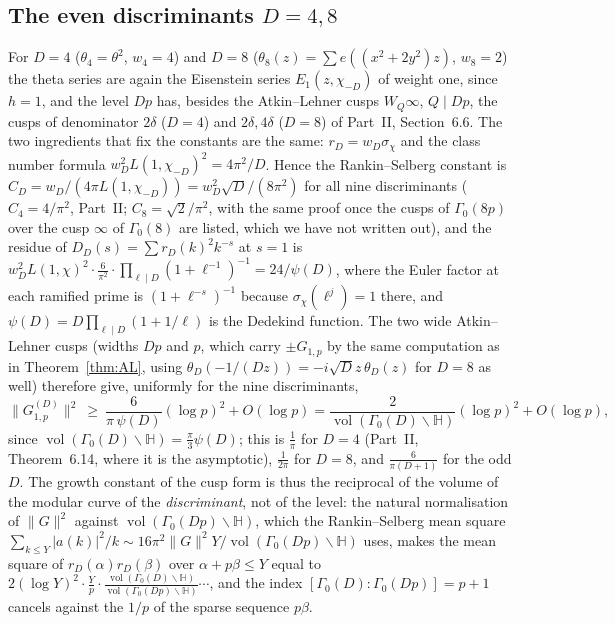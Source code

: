 \documentclass[11pt]{amsart}
\theoremstyle{remark}
\newcommand{\HH}{\mathbb{H}}
\DeclareMathOperator{\vol}{vol}
\begin{document}
\subsection{The even discriminants $D=4,8$}
For $D=4$ ($\theta_4=\theta^2$, $w_4=4$) and $D=8$ ($\theta_8(z)=\sum e((x^2+2y^2)z)$, $w_8=2$) the theta series are again the Eisenstein series $E_1(z,\chi_{-D})$ of weight one, since $h=1$, and the level $Dp$ has, besides the Atkin--Lehner cusps $W_Q\infty$, $Q\mid Dp$, the cusps of denominator $2\delta$ ($D=4$) and $2\delta,4\delta$ ($D=8$) of Part~II, Section~6.6. The two ingredients that fix the constants are the same: $r_D=w_D\sigma_\chi$ and the class number formula $w_D^2L(1,\chi_{-D})^2=4\pi^2/D$. Hence the Rankin--Selberg constant is $C_D=w_D/(4\pi L(1,\chi_{-D}))=w_D^2\sqrt D/(8\pi^2)$ for all nine discriminants ($C_4=4/\pi^2$, Part~II; $C_8=\sqrt2/\pi^2$, with the same proof once the cusps of $\Gamma_0(8p)$ over the cusp $\infty$ of $\Gamma_0(8)$ are listed, which we have not written out), and the residue of $D_D(s)=\sum r_D(k)^2k^{-s}$ at $s=1$ is $w_D^2L(1,\chi)^2\cdot\frac6{\pi^2}\cdot\prod_{\ell\mid D}(1+\ell^{-1})^{-1}=24/\psi(D)$, where the Euler factor at each ramified prime is $(1+\ell^{-s})^{-1}$ because $\sigma_\chi(\ell^j)=1$ there, and $\psi(D)=D\prod_{\ell\mid D}(1+1/\ell)$ is the Dedekind function. The two wide Atkin--Lehner cusps (widths $Dp$ and $p$, which carry $\pm G_{1,p}$ by the same computation as in Theorem~\ref{thm:AL}, using $\theta_D(-1/(Dz))=-i\sqrt Dz\,\theta_D(z)$ for $D=8$ as well) therefore give, uniformly for the nine discriminants,
\[
\|G^{(D)}_{1,p}\|^2\ \ge\ \frac{6}{\pi\,\psi(D)}(\log p)^2+O(\log p)=\frac{2}{\vol(\Gamma_0(D)\backslash\HH)}(\log p)^2+O(\log p),
\]
since $\vol(\Gamma_0(D)\backslash\HH)=\frac\pi3\psi(D)$; this is $\frac1\pi$ for $D=4$ (Part~II, Theorem~6.14, where it is the asymptotic), $\frac1{2\pi}$ for $D=8$, and $\frac6{\pi(D+1)}$ for the odd $D$. The growth constant of the cusp form is thus the reciprocal of the volume of the modular curve of the \emph{discriminant}, not of the level: the natural normalisation of $\|G\|^2$ against $\vol(\Gamma_0(Dp)\backslash\HH)$, which the Rankin--Selberg mean square $\sum_{k\le Y}|a(k)|^2/k\sim16\pi^2\|G\|^2Y/\vol(\Gamma_0(Dp)\backslash\HH)$ uses, makes the mean square of $r_D(\alpha)r_D(\beta)$ over $\alpha+p\beta\le Y$ equal to $2(\log Y)^2\cdot\frac{Y}{p}\cdot\frac{\vol(\Gamma_0(D)\backslash\HH)}{\vol(\Gamma_0(Dp)\backslash\HH)}\cdots$, and the index $[\Gamma_0(D):\Gamma_0(Dp)]=p+1$ cancels against the $1/p$ of the sparse sequence $p\beta$.
\end{document}
